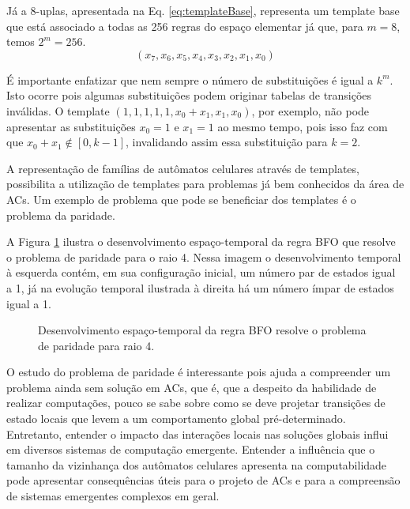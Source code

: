 Já a $8$-uplas, apresentada na Eq. \eqref{eq:templateBase}, representa um template base que está associado a todas as 256 regras do espaço elementar já que, para $m = 8$, temos $2^m = 256 $.
\begin{equation}
(x_7,x_6,x_5,x_4,x_3,x_2,x_1,x_0)
\label{eq:templateBase}
\end{equation}

É importante enfatizar que nem sempre o número de substituições é igual a $k^m$. Isto ocorre pois algumas substituições podem originar tabelas de transições inválidas. O template $(1,1,1,1,1,x_0+x_1,x_1,x_0)$, por exemplo, não pode apresentar as substituições $x_0=1$ e $x_1=1$ ao mesmo tempo, pois isso faz com que $x_0 + x_1 \notin [0, k-1]$, invalidando assim essa substituição para $k=2$.

A representação de famílias de autômatos celulares através de templates, possibilita a utilização de templates para problemas já bem conhecidos da área de ACs. Um exemplo de problema que pode se beneficiar dos templates é o problema da paridade.

A Figura \ref{fig:parity-rule} ilustra o desenvolvimento espaço-temporal da regra BFO \cite{Betel2013} %
que resolve o problema de paridade para o raio 4. Nessa imagem o desenvolvimento temporal à esquerda contém, em sua configuração inicial, um número par de estados igual a 1, já na evolução temporal ilustrada à direita há um número ímpar de estados igual a 1.

\begin{figure}[h!]
\center
{}
\qquad
{}
\caption{Desenvolvimento espaço-temporal da regra BFO resolve o problema de paridade para raio 4.}
\label{fig:parity-rule}
\end{figure}

O estudo do problema de paridade é interessante pois ajuda a compreender um problema ainda sem solução em ACs, que é, que a despeito da habilidade de realizar computações, pouco se sabe sobre %
como se deve projetar transições de estado locais que levem a um comportamento global pré-determinado. %
Entretanto, entender o impacto das interações locais nas soluções globais influi em diversos sistemas de computação emergente. Entender a influência que o tamanho da vizinhança dos autômatos celulares apresenta na computabilidade pode apresentar consequências úteis para o projeto de ACs e para a compreensão de sistemas emergentes complexos em geral.%

